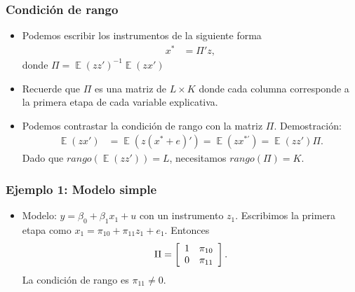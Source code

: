 \documentclass[t, compress, spanish, aspectratio=169]{beamer}
\DeclareMathOperator{\E}{\mathbb{E}}
\begin{document}
\begin{frame}
    \frametitle{Condici\'on de rango}
    \begin{itemize}
        \item  Podemos escribir los instrumentos de la siguiente forma
        \begin{align*}
            x^* &=\Pi'z,
        \end{align*}
        donde $\Pi= \E(zz')^{-1}\E(zx')$
        \item  Recuerde que $\Pi$ es una matriz de $L \times K$ donde cada columna corresponde a la primera etapa de cada variable explicativa.
        \item  Podemos contrastar la condici\'on de rango con la matriz $\Pi$.
         {
        Demostraci\'on:
                \begin{align*}
                    \E(zx')&=\E(z(x^*+e)')=\E(zx^{*'})= \E(zz') \Pi.
                \end{align*}
                Dado que $rango(\E(zz'))=L$, necesitamos $rango(\Pi)=K$.
        }
    \end{itemize}
\end{frame}

\begin{frame}
    \frametitle{Ejemplo 1: Modelo simple}
    \begin{itemize}
        \item  Modelo: $y=\beta_0+\beta_1x_1+u$ con un instrumento $z_1$.
        Escribimos la primera etapa como $x_{1}=\pi_{10}+\pi_{11}z_1+e_1$. Entonces
                \begin{align*}
                    \Pi = \left[ 
                    \begin{array} {c c}
                        1 & \pi_{10}\\
                        0 & \pi_{11}
                    \end{array}
                    \right].
                \end{align*}
        La condici\'on de rango es $\pi_{11}\neq 0$.
      \end{itemize}
\end{frame}
\end{document}
